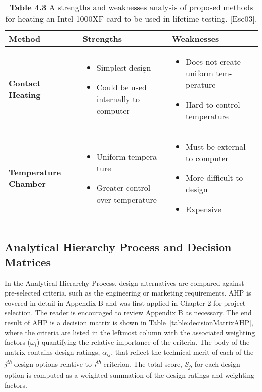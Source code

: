 \begin{table}

\caption{\textbf{Table 4.3} A strengths and weaknesses analysis of proposed
methods for heating an Intel 1000XF card to be used in lifetime testing.
{[}Ese03{]}.}
\label{table:strengthWeakIntel}
\begin{tabular}{|m{3cm}|m{5cm}|m{5cm}|}
\hline
\textbf{Method} &
\textbf{Strengths} &
\textbf{Weaknesses} \\ \hline

\textbf{Contact Heating} & 
\begin{itemize}
\item   Simplest design
\item   Could be used internally to computer
\end{itemize}   &

\begin{itemize}
\item   Does not create uniform tem­perature
\item   Hard to control tempera­ture
\end{itemize} \\ \hline

\textbf{Temperature Chamber} &
\begin{itemize}
\item  Uniform tempera­ture
\item  Greater control over tem­perature
\end{itemize}
&
\begin{itemize}
\item   Must be external to computer
\item   More difficult to design
\item   Expensive
\end{itemize}\\ \hline

\end{tabular}
\end{table}

\subsection{Analytical Hierarchy Process and Decision Matrices}
\label{subsection:analytical-hierarchy-process-and-decision-matrices}

In the Analytical Hierarchy Process, design alternatives are compared
against pre-selected criteria, such as the engineering or marketing
requirements. AHP is covered in detail in Appendix B and was first
applied in Chapter 2 for project selection. The reader is encouraged to
review Appendix B as necessary. The end result of AHP is a decision
matrix is shown in 
Table~\ref{table:decisionMatrixAHP}, where the criteria are listed in the
leftmost column with the associated weighting factors
($\omega_i$) quantifying the relative
importance of the criteria. The body of the matrix contains design
ratings, $\alpha_{ij}$, that reflect the
technical merit of each of the \emph{j\textsuperscript{th}} design
options relative to \emph{i\textsuperscript{th}} criterion. The total
score, \emph{S\textsubscript{j}}, for each design option is computed as
a weighted summation of the design ratings and weighting factors.

